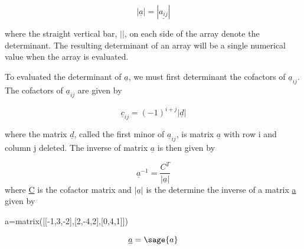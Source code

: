 \documentclass[12pt]{report}
\begin{document}
\begin{equation}
	|\underline {a}| = |\underline{a_{ij}}|
\end{equation}

where the straight vertical bar, $| |$, on each side of the array denote
the determinant. The resulting determinant of an array will be a
single numerical value when the array is evaluated.

To evaluated the determinant of
$\underline{a}$, we must first determinant the
cofactors of $\underline{a}_{ij}$.
The cofactors of $\underline{a}_{ij}$ are given by

\begin{equation}
	\underline{c}_{ij}=(-1)^{i+j} |\underline{d}|
\end{equation}

where the matrix $\underline{d}$, called the first minor of
 $\underline{a}_{ij}$, is matrix $\underline{a}$ with row 
i and column j deleted. The inverse of matrix
$\underline{a}$ is then given by

\begin{equation}
	\underline{a}^{-1}=\frac{C^{T}}{|\underline{a}|}
	\label{eq:cofinverse}
\end{equation}
where \underline{C} is the cofactor matrix and $|\underline{a}|$ is the determine the inverse of a matrix \underline{a} given by 
\begin{sagesilent}
	a=matrix([[-1,3,-2],[2,-4,2],[0,4,1]])
\end{sagesilent}

\begin{equation}
	\underline{a} = \sage{a} 
\end{equation}
\end{document}
